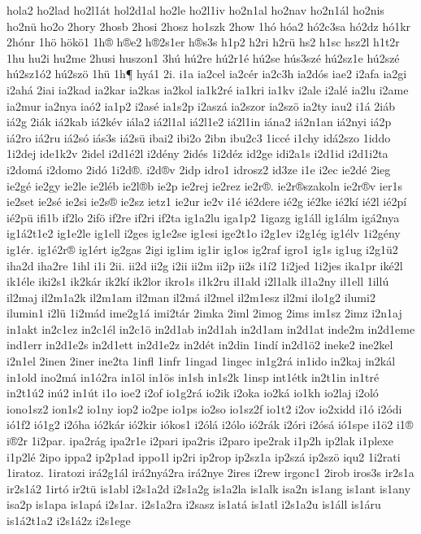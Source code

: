 {hola2
ho2lad
ho2l1át
hol2d1al
ho2le
ho2l1iv
ho2n1al
ho2nav
ho2n1ál
ho2nis
ho2nü
ho2o
2hory
2hosb
2hosi
2hosz
ho1szk
2how
1hó
hóa2
hó2c3sa
hó2dz
hó1kr
2hónr
1hö
hökö1
1h®
h®e2
h®2s1er
h®s3s
h1p2
h2ri
h2rü
hs2
h1sc
hsz2l
h1t2r
1hu
hu2i
hu2me
2husi
huszon1
3hú
hú2re
hú2r1é
hú2se
hús3szé
hú2sz1e
hú2szé
hú2sz1ó2
hú2szö
1hü
1h¶
hyá1
2i.
i1a
ia2cel
ia2cér
ia2c3h
ia2dós
iae2
i2afa
ia2gi
i2ahá
2iai
ia2kad
ia2kar
ia2kas
ia2kol
ia1k2ré
ia1kri
ia1kv
i2ale
i2alé
ia2lu
i2ame
ia2mur
ia2nya
iaó2
ia1p2
i2asé
ia1s2p
i2aszá
ia2szor
ia2szö
ia2ty
iau2
i1á
2iáb
iá2g
2iák
iá2kab
iá2kév
iála2
iá2l1al
iá2l1e2
iá2l1in
iána2
iá2n1an
iá2nyi
iá2p
iá2ro
iá2ru
iá2só
iás3s
iá2sü
ibai2
ibi2o
2ibn
ibu2c3
1iccé
i1chy
idá2szo
1iddo
1i2dej
ide1k2v
2idel
i2d1é2l
i2dény
2idés
1i2déz
id2ge
idi2a1s
i2d1id
i2d1i2ta
i2domá
i2domo
2idó
1i2d®.
i2d®v
2idp
idro1
idrosz2
id3ze
i1e
i2ec
ie2dé
2ieg
ie2gé
ie2gy
ie2le
ie2léb
ie2l®b
ie2p
ie2rej
ie2rez
ie2r®.
ie2r®szakoln
ie2r®v
ier1s
ie2set
ie2sé
ie2si
ie2s®
ie2sz
ietz1
ie2ur
ie2v
i1é
ié2dere
ié2g
ié2ke
ié2kí
ié2l
ié2pí
ié2pü
ifi1b
if2lo
2ifö
if2re
if2ri
if2ta
ig1a2lu
iga1p2
1igazg
ig1áll
ig1álm
igá2nya
ig1á2t1e2
ig1e2le
ig1ell
i2ges
ig1e2se
ig1esi
ige2t1o
i2g1ev
i2g1ég
ig1élv
1i2gény
ig1ér.
ig1é2r®
ig1ért
ig2gas
2igi
ig1im
ig1ir
ig1os
ig2raf
igro1
ig1s
ig1ug
i2g1ü2
iha2d
iha2re
1ihl
i1i
2ii.
ii2d
ii2g
i2ii
ii2m
ii2p
ii2s
i1í2
1i2jed
1i2jes
ika1pr
iké2l
ik1éle
iki2s1
ik2kár
ik2kí
ik2lor
ikro1s
i1k2ru
il1ald
i2l1alk
il1a2ny
il1ell
1illú
il2maj
il2m1a2k
il2m1am
il2man
il2má
il2mel
il2m1esz
il2mi
ilo1g2
ilumi2
ilumin1
i2lü
1i2mád
ime2g1á
imi2tár
2imka
2iml
2imog
2ims
im1sz
2imz
i2n1aj
in1akt
in2c1ez
in2c1él
in2c1ö
in2d1ab
in2d1ah
in2d1am
in2d1at
inde2m
in2d1eme
ind1err
in2d1e2s
in2d1ett
in2d1e2z
in2dét
in2din
1indí
in2d1ö2
ineke2
ine2kel
i2n1el
2inen
2iner
ine2ta
1infl
1infr
1ingad
1ingec
in1g2rá
in1ido
in2kaj
in2kál
in1old
ino2má
in1ó2ra
in1öl
in1ös
in1sh
in1s2k
1insp
int1étk
in2t1in
in1tré
in2t1ú2
inú2
in1út
i1o
ioe2
i2of
io1g2rá
io2ik
i2oka
io2ká
io1kh
io2laj
i2oló
iono1sz2
ion1s2
io1ny
iop2
io2pe
io1ps
io2so
io1sz2f
io1t2
i2ov
io2xidd
i1ó
i2ódi
ió1f2
ió1g2
i2óha
ió2kár
ió2kir
iókos1
i2ólá
i2ólo
ió2rák
i2óri
i2ósá
ió1spe
i1ö2
i1®
i®2r
1i2par.
ipa2rág
ipa2r1e
i2pari
ipa2ris
i2paro
ipe2rak
i1p2h
ip2lak
i1plexe
i1p2lé
2ipo
ippa2
ip2p1ad
ippo1l
ip2ri
ip2rop
ip2sz1a
ip2szá
ip2szö
iqu2
1i2rati
1iratoz.
1iratozi
irá2g1ál
irá2nyá2ra
irá2nye
2ires
i2rew
irgonc1
2irob
iros3s
ir2s1a
ir2s1á2
1irtó
ir2tü
is1abl
i2s1a2d
i2s1a2g
is1a2la
is1alk
isa2n
is1ang
is1ant
is1any
isa2p
is1apa
is1apá
i2s1ar.
i2s1a2ra
i2sasz
is1atá
is1atl
i2s1a2u
is1áll
is1áru
is1á2t1a2
i2s1á2z
i2s1ege
}
